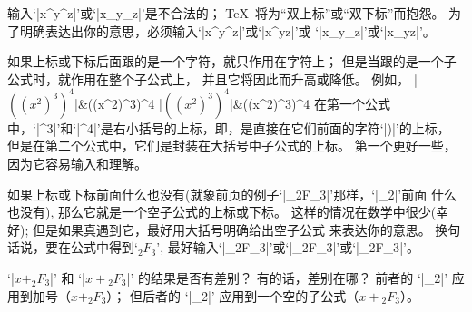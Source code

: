 输入`|x^y^z|'或`|x_y_z|'是不合法的；
 \TeX\ 将为``双上标''或``双下标''而抱怨。%
为了明确表达出你的意思，必须输入`|x^{y^z}|'或`|x^{yz}|'或%
`|x_{y_z}|'或`|x_{yz}|'。

如果上标或下标后面跟的是一个字符，就只作用在字符上；
但是当跟的是一个子公式时，就作用在整个子公式上，
并且它将因此而升高或降低。%
例如，
\beginmathdemo
|$((x^2)^3)^4$|&((x^2)^3)^4\cr
|${({(x^2)}^3)}^4$|&{({(x^2)}^3)}^4\cr
\endmathdemo
在第一个公式中，`|^3|'和`|^4|'是右小括号的上标，即，是直接在它们前面的字符`|)|'的上标，
但是在第二个公式中，它们是封装在大括号中子公式的上标。%
第一个更好一些，因为它容易输入和理解。

\danger 如果上标或下标前面什么也没有(就象前页的例子`|_2F_3|'那样，`|_2|'前面%
什么也没有), 那么它就是一个空子公式的上标或下标。%
这样的情况在数学中很少(幸好); 但是如果真遇到它，最好用大括号明确给出空子公式%
来表达你的意思。%
换句话说，要在公式中得到`${}_2F_3$', 最好输入`|{}_2F_3|'或`|{_2}F_3|'或`|{_2F_3}|'。%

\dangerexercise `|$x + _2F_3$|' 和 `|$x + {}_2F_3$|' 的结果是否有差别？
有的话，差别在哪？
\answer 前者的 `|_2|' 应用到加号（$x + _2F_3$）；
但后者的 `|_2|' 应用到一个空的子公式（$x + {}_2F_3$）。

